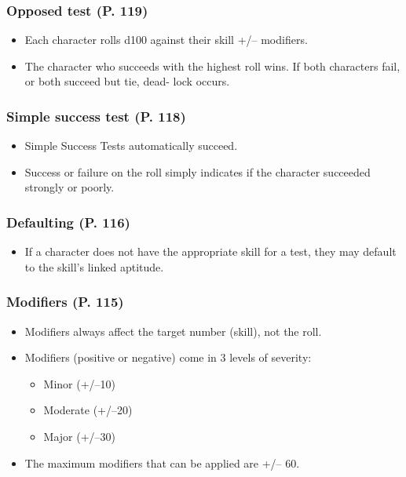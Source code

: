 \subsubsection{Opposed test (P. 119)}

\begin{itemize}
\item Each character rolls d100 against their skill +/– modifiers.
\item The character who succeeds with the highest roll wins. If both characters fail, or both succeed but tie, dead- lock occurs.
\end{itemize}

\subsubsection{Simple success test (P. 118)}

\begin{itemize}
\item Simple Success Tests automatically succeed.
\item Success or failure on the roll simply indicates if the character succeeded strongly or poorly.
\end{itemize}

\subsubsection{Defaulting (P. 116)}

\begin{itemize}
\item If a character does not have the appropriate skill for a test, they may default to the skill’s linked aptitude.
\end{itemize}

\subsubsection{Modifiers (P. 115)}

\begin{itemize}
\item Modifiers always affect the target number (skill), not the roll.
\item Modifiers (positive or negative) come in 3 levels of severity: \begin{itemize}
\item Minor (+/–10)
\item Moderate (+/–20)
\item Major (+/–30)
\end{itemize}
\item The maximum modifiers that can be applied are +/– 60.
\end{itemize}

